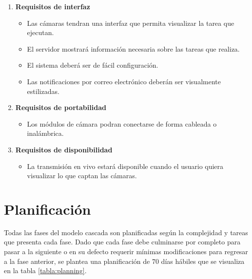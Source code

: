 \begin{enumerate}
    \item  \textbf{Requisitos de interfaz} 
        \begin{itemize}
            \item Las cámaras tendran una interfaz que permita visualizar la tarea que ejecutan.
            \item El servidor mostrará información necesaria sobre las tareas que realiza.
            \item El sistema deberá ser de fácil configuración.
            \item Las notificaciones por correo electrónico deberán ser visualmente estilizadas.
        \end{itemize}
    \item \textbf{Requisitos de portabilidad}
        \begin{itemize}
            \item Los módulos de cámara podran conectarse de forma cableada o inalámbrica.
        \end{itemize}
    \item \textbf{Requisitos de disponibilidad}
        \begin{itemize}
            \item La transmisión en vivo estará disponible cuando el usuario quiera visualizar lo que captan las cámaras.
        \end{itemize}
\end{enumerate}

\section{Planificación}
Todas las fases del modelo cascada son planificadas según la complejidad y tareas que presenta cada fase. Dado que cada fase debe culminarse por completo para pasar a la siguiente o en su defecto requerir mínimas modificaciones para regresar a la fase anterior, se plantea una planificación de 70 días hábiles que se visualiza en la tabla \ref{tabla:planning}.\\

